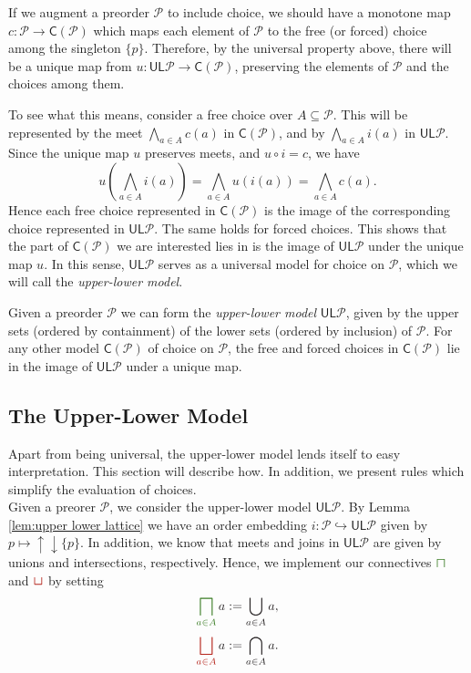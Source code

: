 \documentclass[12pt]{article}
\theoremstyle{definition}
\theoremstyle{plain}
\theoremstyle{plain}
\theoremstyle{plain}
\theoremstyle{plain}
\theoremstyle{remark}
\theoremstyle{remark}
\newcommand{\mc}[1]{\mathcal{#1}}
\newcommand{\sub}{\subseteq}
\newcommand{\low}{\mathsf{L}}
\newcommand{\upper}{\mathsf{U}}
\newcommand{\upc}[1]{{\uparrow #1}}
\newcommand{\lwc}[1]{{\downarrow #1}}
\newcommand{\cbigsqcap}[1]{\color{OliveGreen}\bigsqcap_{#1}\color{Black}}
\newcommand{\csqcap}{\color{OliveGreen}\bm{\sqcap}\color{Black}}
\newcommand{\cbigsqcup}[1]{\color{BrickRed}\bigsqcup_{#1}\color{Black}}
\newcommand{\csqcup}{\color{BrickRed}\bm{\sqcup}\color{Black}}
\begin{document}
If we augment a preorder $\mc{P}$ to include choice, we should have a monotone map $c: \mc{P} \rightarrow \mathsf{C}(\mc{P})$ which maps each element of $\mc{P}$ to the free (or forced) choice among the singleton $\{p\}$. Therefore, by the universal property above, there will be a unique map from $u: \upper\low\mc{P} \rightarrow \mathsf{C}(\mc{P})$, preserving the elements of $\mc{P}$ and the choices among them. 

To see what this means, consider a free choice over $A \sub \mc{P}$. This will be represented by the meet $\bigwedge_{a \in A} c(a)$ in $\mathsf{C}(\mc{P})$, and by $\bigwedge_{a \in A} i(a)$ in $\upper\low\mc{P}$. Since the unique map $u$ preserves meets, and $u \circ i = c$, we have
$$u \left ( \bigwedge_{a \in A} i(a) \right) = \bigwedge_{a \in A} u(i(a)) = \bigwedge_{a \in A} c(a).$$
Hence each free choice represented in $\mathsf{C}(\mc{P})$ is the image of the corresponding choice represented in $\upper\low\mc{P}$. The same holds for forced choices. This shows that the part of $\mathsf{C}(\mc{P})$ we are interested lies in is the image of $\upper\low\mc{P}$ under the unique map $u$. In this sense, $\upper\low\mc{P}$ serves as a universal model for choice on $\mc{P}$, which we will call the \emph{upper-lower model}.

\begin{tcolorbox}[title=Universal Model for Choice, colframe=Apricot, colback = paleorange, coltitle = Sepia]
	Given a preorder $\mc{P}$ we can form the \emph{upper-lower model} $\upper\low\mc{P}$, given by the upper sets (ordered by containment) of the lower sets (ordered by inclusion) of $\mc{P}$. For any other model $\mathsf{C}(\mc{P})$ of choice on $\mc{P}$, the free and forced choices in $\mathsf{C}(\mc{P})$ lie in the image of $\upper\low\mc{P}$ under a unique map. 
\end{tcolorbox}

\subsection{The Upper-Lower Model}\label{sec:upper-lower model}
Apart from being universal, the upper-lower model lends itself to easy interpretation. This section will describe how. In addition, we present rules which simplify the evaluation of choices. \\

Given a preorer $\mc{P}$, we consider the upper-lower model $\upper\low\mc{P}$. By Lemma \ref{lem:upper lower lattice} we have an order embedding $i: \mc{P} \hookrightarrow \upper\low\mc{P}$ given by $p \mapsto \upc{\lwc{\{p\}}}$. In addition, we know that meets and joins in $\upper\low\mc{P}$ are given by unions and intersections, respectively. Hence, we implement our connectives $\csqcap$ and $\csqcup$ by setting 
$$ \cbigsqcap{a \in A} a :=  \bigcup_{a \in A} a,$$
$$ \cbigsqcup{a \in A} a := \bigcap_{a \in A} a.$$
\end{document}
